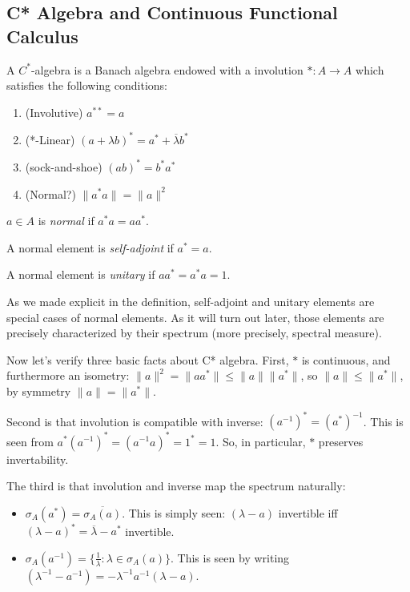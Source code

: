 
\subsection{C* Algebra and Continuous Functional Calculus}


\begin{definition}[C* Algebra]
	\label{defn:CAlgebra}
	A $C^*$-algebra is a Banach algebra endowed with a involution $*: A \to A$ which satisfies the following conditions:
	\begin{enumerate}
		\item (Involutive) $a^{* *} = a$
		\item (*-Linear) $(a + \lambda b)^* = a^* + \overline{\lambda} b^*$
		\item (sock-and-shoe) $(ab)^* = b^* a^*$
		\item (Normal?) $\|a^* a\| = \|a\|^2$
	\end{enumerate}
\end{definition}

\begin{definition}
	\label{defn:NormalUnitarySA}
	$a \in A$ is \textit{normal} if $a^* a = a a^*$.

	A normal element is \textit{self-adjoint} if $a^* = a$.

	A normal element is \textit{unitary} if $a a^* = a^* a =  1$.
\end{definition}
As we made explicit in the definition, self-adjoint and unitary elements are special cases of normal elements. As it will turn out later, those elements are precisely characterized by their spectrum (more precisely, spectral measure).

Now let's verify three basic facts about C* algebra. First, $*$ is continuous, and furthermore an isometry: $\|a\|^2 = \|a a^*\|\le \|a\| \|a^*\|$, so $\|a\| \le \|a^*\|$, by symmetry $\|a\| = \|a^*\|$.

Second is that involution is compatible with inverse: $(a^{-1})^* = \left( a^* \right) ^{-1}$. This is seen from $a^*(a^{-1})^* = (a^{-1} a)^* = 1^* = 1$. So, in particular, $*$ preserves invertability.

The third is that involution and inverse map the spectrum naturally: 
\begin{itemize}
	\item 
$\sigma_A(a^*) = \overline{\sigma_A(a)} $. This is simply seen: $(\lambda - a)$ invertible iff $(\lambda - a)^* = \overline{\lambda}  - a^*$ invertible. 

	\item $\sigma_A(a^{-1}) = \{\frac{1}{\lambda}: \lambda \in \sigma_A(a)\} $. This is seen by writing $(\lambda^{-1} - a^{-1}) = -\lambda^{-1} a^{-1} (\lambda - a)$.
\end{itemize}

